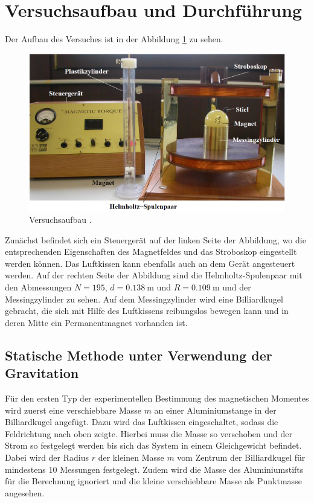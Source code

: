 \section{Versuchsaufbau und Durchführung}
\label{sec:Versuchsaufbau und Durchführung}
Der Aufbau des Versuches ist in der Abbildung \ref{fig:versuchsaufbau} zu sehen.
\begin{figure}[h!]
	\centering
	\includegraphics[width=0.65\linewidth]{Versuchsaufbau.png}
	\caption{Versuchsaufbau \cite[3]{anleitung105}.}
	\label{fig:versuchsaufbau}
\end{figure}
Zunächst befindet sich ein Steuergerät auf der linken Seite der Abbildung, wo die entsprechenden Eigenschaften des Magnetfeldes und das Stroboskop eingestellt werden können. Das Luftkissen kann ebenfalls auch an dem 
Gerät angesteuert werden. Auf der rechten Seite der Abbildung sind die Helmholtz-Spulenpaar mit den Abmessungen $N=195$, $d=\SI{0.138}{\meter}$ und $R=\SI{0.109}{\meter}$ und der Messingzylinder zu sehen. 
Auf dem Messingzylinder wird eine Billiardkugel gebracht, die sich mit Hilfe des Luftkissens reibungslos bewegen kann und in deren Mitte ein Permanentmagnet vorhanden ist. 

\subsection{Statische Methode unter Verwendung der Gravitation}
Für den ersten Typ der experimentellen Bestimmung des magnetischen Momentes wird zuerst eine verschiebbare Masse $m$  an einer Aluminiumstange in der Billiardkugel angefügt. Dazu wird das Luftkissen eingeschaltet, 
sodass die Feldrichtung nach oben zeigte. Hierbei muss die Masse so verschoben und der Strom so festgelegt werden bis sich das System in einem Gleichgewicht befindet. Dabei wird der Radius $r$ der kleinen Masse $m$ 
vom Zentrum der Billiardkugel für mindestens $10$ Messungen festgelegt. Zudem wird die Masse des Aluminiumstifts für die Berechnung ignoriert und die kleine verschiebbare Masse als Punktmasse angesehen. 

